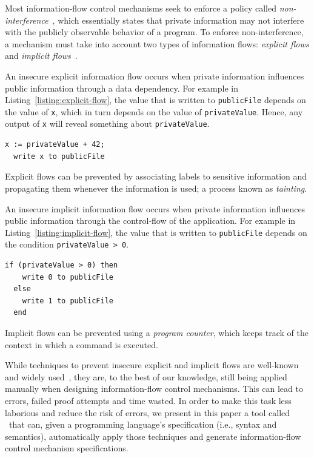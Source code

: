 \documentclass[conference]{IEEEtran}
\begin{document}
Most information-flow control mechanisms seek to enforce a policy called \emph{non-interference}~\cite{DBLP:conf/sp/GoguenM82a}, which essentially states that private information may not interfere with the publicly observable behavior of a program. To enforce non-interference, a mechanism must take into account two types of information flows: \emph{explicit flows} and \emph{implicit flows}~\cite{DBLP:journals/cacm/Denning76}.

An insecure explicit information flow occurs when private information influences public information through a data dependency. For example in Listing~\ref{listing:explicit-flow}, the value that is written to \lstinline{publicFile} depends on the value of \lstinline{x}, which in turn depends on the value of \lstinline{privateValue}. Hence, any output of \lstinline{x} will reveal something about \lstinline{privateValue}.
\begin{lstlisting}[captionpos=b, caption=Insecure explicit flow, label=listing:explicit-flow]
  x := privateValue + 42;
  write x to publicFile
\end{lstlisting}
Explicit flows can be prevented by associating labels to sensitive information and propagating them whenever the information is used; a process known as \emph{tainting}.

\pagebreak
An insecure implicit information flow occurs when private information influences public information through the control-flow of the application. For example in Listing~\ref{listing:implicit-flow}, the value that is written to \lstinline{publicFile} depends on the condition \lstinline{privateValue > 0}. 

\begin{lstlisting}[captionpos=b, caption=Insecure implicit flow, label=listing:implicit-flow]
  if (privateValue > 0) then
    write 0 to publicFile
  else
    write 1 to publicFile
  end
\end{lstlisting}
Implicit flows can be prevented using a \emph{program counter}, which keeps track of the context in which a command is executed.

While techniques to prevent insecure explicit and implicit flows are well-known and widely used~\cite{DBLP:journals/jsac/SabelfeldM03}, they are, to the best of our knowledge, still being applied manually when designing information-flow control mechanisms. This can lead to errors, failed proof attempts and time wasted. In order to make this task less laborious and reduce the risk of errors, we present in this paper a tool called \ottifc\ that can, given a programming language's specification (i.e., syntax and semantics), automatically apply those techniques and generate information-flow control mechanism specifications.
\end{document}
